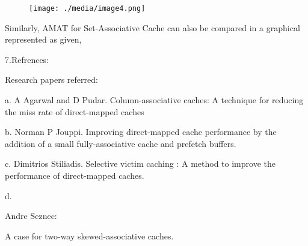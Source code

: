 \documentclass[12pt]{article}
\begin{document}

\par




\begin{figure}[H]
\advance\leftskip 1.27in		\texttt{[image: ./media/image4.png]}
\end{figure}



{\fontsize{16pt}{19.2pt}\selectfont Similarly, AMAT for Set-Associative Cache can also be compared in a graphical represented as given,\par}\par


\vspace{\baselineskip}

\vspace{\baselineskip}
{\fontsize{22pt}{26.4pt}\selectfont 7.Refrences:\par}\par

{\fontsize{16pt}{19.2pt} Research papers referred:\par}\par

{\fontsize{16pt}{19.2pt}\selectfont a.  A Agarwal and D Pudar. Column-associative caches: A technique for reducing the miss rate of direct-mapped caches\par}\par

{\fontsize{16pt}{19.2pt}\selectfont  b. Norman P Jouppi. Improving direct-mapped cache performance by the addition of a small fully-associative cache and prefetch buffers. \par}\par

{\fontsize{16pt}{19.2pt}\selectfont c. Dimitrios Stiliadis. Selective victim caching : A method to improve the performance of direct-mapped caches. \par}\par

{\fontsize{16pt}{19.2pt}\selectfont d.\par} {\fontsize{16pt}{19.2pt}\selectfont Andre Seznec:\par} {\fontsize{16pt}{19.2pt}\selectfont A case for two-way skewed-associative caches.\par}\par
\end{document}
